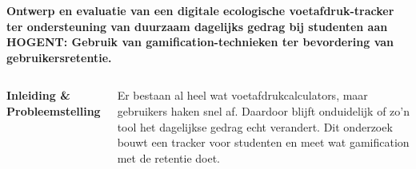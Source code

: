 \documentclass[aspectratio=169]{beamer}
\begin{document}
\begin{frame}[t]
    \begin{tcolorbox}[
        colback=colorfive,
        colframe=colorfive,
        coltext=white,
        before skip=0pt,
        after skip=0pt,
        boxrule=0pt,
        arc=2mm]
        \small \textbf{Ontwerp en evaluatie van een digitale ecologische voetafdruk-tracker ter ondersteuning van duurzaam dagelijks gedrag bij studenten aan HOGENT: Gebruik van gamification-technieken ter bevordering van gebruikersretentie.}
    \end{tcolorbox}
    \begin{columns}[t,onlytextwidth] %
        \begin{tcolorbox}[columntitle, height=1.1cm]
            \textbf{Inleiding \&\\ Probleemstelling}
        \end{tcolorbox}
        \begin{tcolorbox}[columntext]
            \tiny Er bestaan al heel wat voetafdrukcalculators, maar gebruikers haken snel af. Daardoor blijft onduidelijk of zo'n tool het dagelijkse gedrag echt verandert. Dit onderzoek bouwt een tracker voor studenten en meet wat gamification met de retentie doet.
        \end{tcolorbox}
        

\end{columns}
\end{frame}
\end{document}
